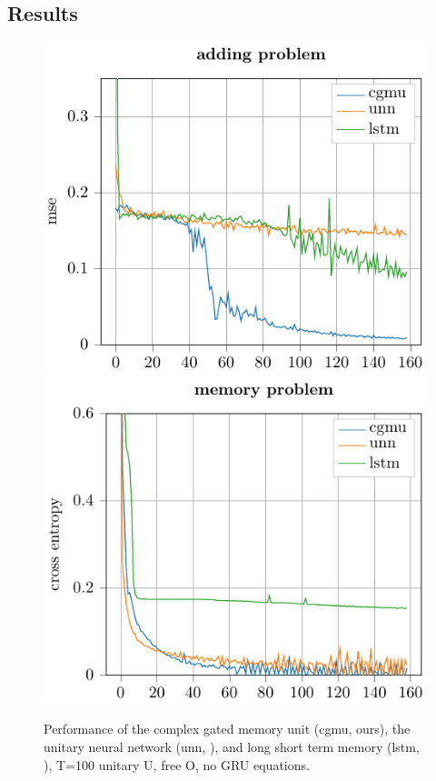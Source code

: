 \documentclass{article}
\begin{document}
\subsection{Results}
\begin{figure}
\centering
%
\includegraphics[width=0.45\linewidth]{./img/cgmu/adding_problem.pdf}
%
\includegraphics[width=0.45\linewidth]{./img/cgmu/memory_problem.pdf}
\caption{Performance of the complex gated memory unit (cgmu, ours), the unitary neural network (unn, \cite{Arjovsky}), and long short term memory (lstm, \cite{Hochreiter}), T=100 unitary U, free O, no GRU equations.}
\label{fig:montreal_eval}
\end{figure}
\end{document}
